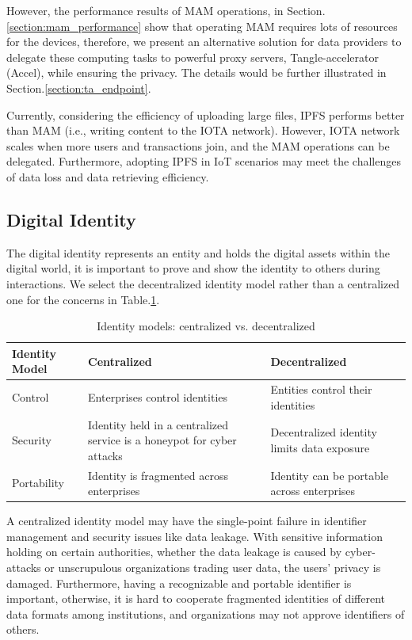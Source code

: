 \documentclass[10pt, conference, compsocconf]{IEEEtran}
\begin{document}
However, the performance results of MAM operations, in Section.\ref{section:mam_performance} show that operating MAM requires lots of resources for the devices, therefore, we present an alternative solution for data providers to delegate these computing tasks to powerful proxy servers, Tangle-accelerator (Accel)\cite{TA}, while ensuring the privacy. The details would be further illustrated in Section.\ref{section:ta_endpoint}.

Currently, considering the efficiency of uploading large files, IPFS performs better than MAM (i.e., writing content to the IOTA network). However, IOTA network scales when more users and transactions join, and the MAM operations can be delegated. Furthermore, adopting IPFS in IoT scenarios may meet the challenges of data loss and data retrieving efficiency.

\subsection{Digital Identity}
The digital identity represents an entity and holds the digital assets within the digital world, it is important to prove and show the identity to others during interactions. We select the decentralized identity model rather than a centralized one for the concerns in Table.\ref{tab:did}.
\begin{table}[h]
    \caption{Identity models: centralized vs. decentralized}
    \label{tab:did}
    \begin{tabularx}{\linewidth}{|l|X|X|}
    \hline
        \textbf{Identity Model} & \textbf{Centralized} & \textbf{Decentralized} \\
        \hline
        Control & Enterprises control identities & Entities control their identities \\
        \hline
        Security & Identity held in a centralized service is a honeypot for cyber attacks & Decentralized identity limits data exposure \\
        \hline
        Portability & Identity is fragmented across enterprises & Identity can be portable across enterprises \\
        \hline
    \end{tabularx}
\end{table}

A centralized identity model may have the single-point failure in identifier management and security issues like data leakage. With sensitive information holding on certain authorities, whether the data leakage is caused by cyber-attacks or unscrupulous organizations trading user data, the users' privacy is damaged. Furthermore, having a recognizable and portable identifier is important, otherwise, it is hard to cooperate fragmented identities of different data formats among institutions, and organizations may not approve identifiers of others.
\end{document}
